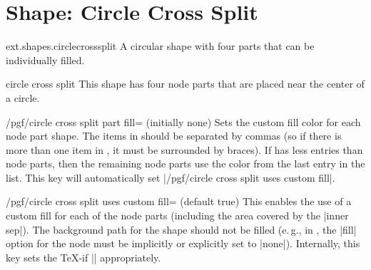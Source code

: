 %
%
%
\section{Shape: Circle Cross Split}
\begin{pgflibrary}{ext.shapes.circlecrosssplit}
  A circular shape with four parts that can be individually filled.
\end{pgflibrary}
\begin{shape}{circle cross split}
This shape has four node parts that are placed near the center of a circle.

\begin{key}{/pgf/circle cross split part fill= (initially none)}
Sets the custom fill color for each node part shape.
The items in  should be separated by commas
(so if there is more than one item in , it must be surrounded by braces).
If  has less entries than node parts,
then the remaining node parts use the color from the last entry in the list.
This key will automatically set |/pgf/circle cross split uses custom fill|.
\end{key}
\begin{key}{/pgf/circle cross split uses custom fill= (default true)}
This enables the use of a custom fill for each of the node parts
(including the area covered by the |inner sep|).
The background path for the shape should not be filled (e.\,g., in \tikzname,
the |fill| option for the node must be implicitly or explicitly set to |none|).
Internally, this key sets the \TeX-if |\ifpgfcirclecrosssplitcustomfill| appropriately. 
\end{key}
\begin{codeexample}[preamble=\usepgflibrary{ext.shapes.circlecrosssplit}]
\end{codeexample}
\end{shape}
\endinput